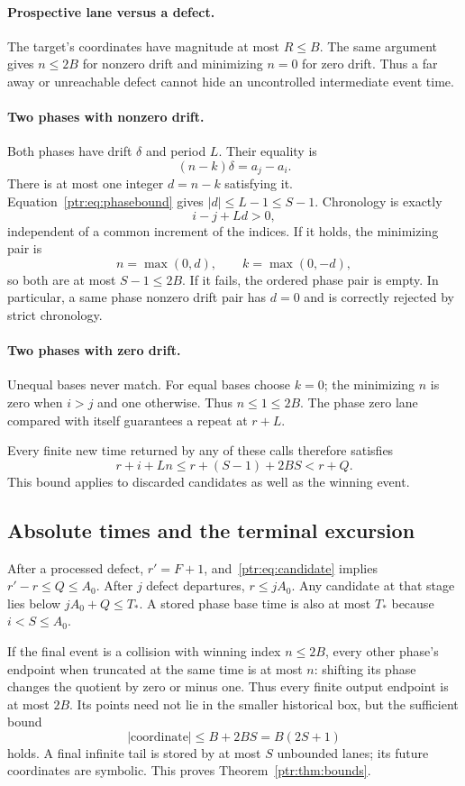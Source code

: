 \documentclass[11pt,letterpaper]{article}
\theoremstyle{definition}\newtheorem{definition}[theorem]{Definition}
\theoremstyle{remark}\newtheorem{remark}[theorem]{Remark}
\begin{document}
\paragraph{Prospective lane versus a defect.}
The target's coordinates have magnitude at most $R\le B$. The same argument gives $n\le2B$ for nonzero drift and minimizing $n=0$ for zero drift. Thus a far away or unreachable defect cannot hide an uncontrolled intermediate event time.

\paragraph{Two phases with nonzero drift.}
Both phases have drift $\delta$ and period $L$. Their equality is
\[
 (n-k)\delta=a_j-a_i.
\]
There is at most one integer $d=n-k$ satisfying it. Equation~\eqref{ptr:eq:phasebound} gives $|d|\le L-1\le S-1$. Chronology is exactly
\[
 i-j+Ld>0,
\]
independent of a common increment of the indices. If it holds, the minimizing pair is
\[
 n=\max(0,d),\qquad k=\max(0,-d),
\]
so both are at most $S-1\le2B$. If it fails, the ordered phase pair is empty. In particular, a same phase nonzero drift pair has $d=0$ and is correctly rejected by strict chronology.

\paragraph{Two phases with zero drift.}
Unequal bases never match. For equal bases choose $k=0$; the minimizing $n$ is zero when $i>j$ and one otherwise. Thus $n\le1\le2B$. The phase zero lane compared with itself guarantees a repeat at $r+L$.

Every finite new time returned by any of these calls therefore satisfies
\begin{equation}\label{ptr:eq:candidate}
 r+i+Ln\le r+(S-1)+2BS<r+Q.
\end{equation}
This bound applies to discarded candidates as well as the winning event.

\subsection{Absolute times and the terminal excursion}
After a processed defect, $r'=F+1$, and~\eqref{ptr:eq:candidate} implies $r'-r\le Q\le A_0$. After $j$ defect departures, $r\le jA_0$. Any candidate at that stage lies below $jA_0+Q\le T_*$. A stored phase base time is also at most $T_*$ because $i<S\le A_0$.

If the final event is a collision with winning index $n\le2B$, every other phase's endpoint when truncated at the same time is at most $n$: shifting its phase changes the quotient by zero or minus one. Thus every finite output endpoint is at most $2B$. Its points need not lie in the smaller historical box, but the sufficient bound
\begin{equation}\label{ptr:eq:terminalcoord}
 |\text{coordinate}|\le B+2BS=B(2S+1)
\end{equation}
holds. A final infinite tail is stored by at most $S$ unbounded lanes; its future coordinates are symbolic. This proves Theorem~\ref{ptr:thm:bounds}.
\end{document}
